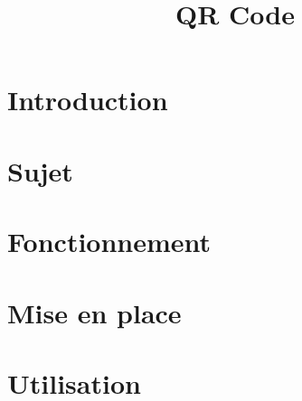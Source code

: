 \documentclass{article}
\title{QR Code}
\date{}
\begin{document}
\maketitle
\part*{Introduction}
\part*{Sujet}
\part{Fonctionnement}
\part{Mise en place}
\part{Utilisation}
\end{document}
